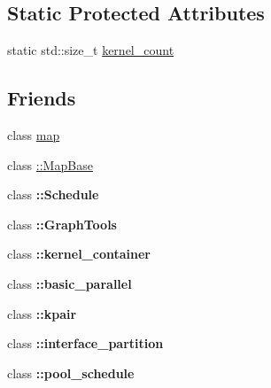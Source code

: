 \subsection*{Static Protected Attributes}
\begin{DoxyCompactItemize}
\item 
static std\+::size\+\_\+t \hyperlink{classraft_1_1kernel_a98e05f7418c208e28b9112e92df7eccf}{kernel\+\_\+count}
\end{DoxyCompactItemize}
\subsection*{Friends}
\begin{DoxyCompactItemize}
\item 
class \hyperlink{classraft_1_1kernel_aeda338414e516b47761f994fb78056c6}{map}
\item 
class \hyperlink{classraft_1_1kernel_a1045638a7591b3c72cd145fc541d6478}{\+::\+Map\+Base}
\item 
\hypertarget{classraft_1_1kernel_a59b0d31ff28240338a2b6e682030ca3c}{}\label{classraft_1_1kernel_a59b0d31ff28240338a2b6e682030ca3c} 
class {\bfseries \+::\+Schedule}
\item 
\hypertarget{classraft_1_1kernel_a24755791643232aebfeedaa4ff0ecf03}{}\label{classraft_1_1kernel_a24755791643232aebfeedaa4ff0ecf03} 
class {\bfseries \+::\+Graph\+Tools}
\item 
\hypertarget{classraft_1_1kernel_aa3a6c191bed2aef9502f837b67e786b2}{}\label{classraft_1_1kernel_aa3a6c191bed2aef9502f837b67e786b2} 
class {\bfseries \+::kernel\+\_\+container}
\item 
\hypertarget{classraft_1_1kernel_ae75d52e84ecfc11bcaa43dd9fe149a2f}{}\label{classraft_1_1kernel_ae75d52e84ecfc11bcaa43dd9fe149a2f} 
class {\bfseries \+::basic\+\_\+parallel}
\item 
\hypertarget{classraft_1_1kernel_ae07b02dff85bd74c2d4d69d55bafe0a2}{}\label{classraft_1_1kernel_ae07b02dff85bd74c2d4d69d55bafe0a2} 
class {\bfseries \+::kpair}
\item 
\hypertarget{classraft_1_1kernel_a6b0f0238fe633a6ff44089d4667d3a7a}{}\label{classraft_1_1kernel_a6b0f0238fe633a6ff44089d4667d3a7a} 
class {\bfseries \+::interface\+\_\+partition}
\item 
\hypertarget{classraft_1_1kernel_a24b9e107a2ae5dbaf9831c0acc54df32}{}\label{classraft_1_1kernel_a24b9e107a2ae5dbaf9831c0acc54df32} 
class {\bfseries \+::pool\+\_\+schedule}
\end{DoxyCompactItemize}


